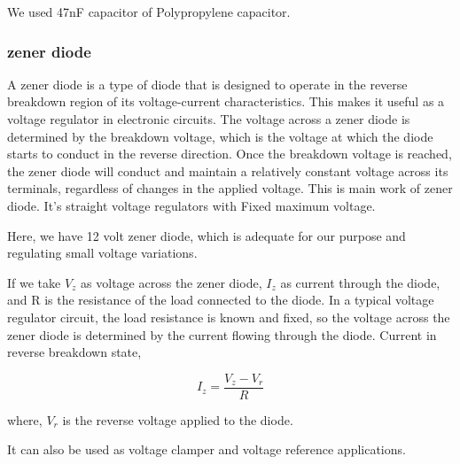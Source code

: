 \documentclass[14pt,a4paper]{extarticle}
\begin{document}
We used 47nF capacitor of Polypropylene capacitor.
\subsubsection{zener diode}
\label{sec:orge75e11e}

A zener diode is a type of diode that is designed to operate in the reverse breakdown region of its voltage-current characteristics. This makes it useful as a voltage regulator in electronic circuits. The voltage across a zener diode is determined by the breakdown voltage, which is the voltage at which the diode starts to conduct in the reverse direction. Once the breakdown voltage is reached, the zener diode will conduct and maintain a relatively constant voltage across its terminals, regardless of changes in the applied voltage. This is main work of zener diode. It's straight voltage regulators with Fixed maximum voltage.

Here, we have 12 volt zener diode, which is adequate for our purpose and regulating small voltage variations.

If we take \(V_z\) as voltage across the zener diode, \(I_z\) as current through the diode, and R is the resistance of the load connected to the diode. In a typical voltage regulator circuit, the load resistance is known and fixed, so the voltage across the zener diode is determined by the current flowing through the diode. Current in reverse breakdown state,

$$I_z = \frac{V_z - V_r}{R}$$

where, \(V_r\) is the reverse voltage applied to the diode.

It can also be used as voltage clamper and voltage reference applications.
\end{document}
